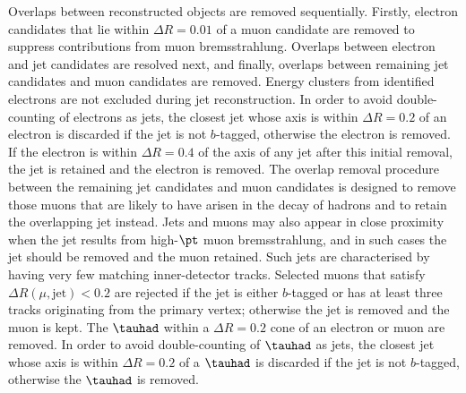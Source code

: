 Overlaps between reconstructed objects are removed sequentially. Firstly, electron candidates that lie 
within $\Delta R = 0.01$ of a muon candidate are removed to suppress contributions from muon bremsstrahlung. 
Overlaps between electron and jet candidates are resolved next, and finally, overlaps between remaining jet candidates 
and muon candidates are removed. Energy clusters from identified electrons are not excluded during jet reconstruction. 
In order to avoid double-counting of electrons as jets, the closest jet whose axis is within ${\Delta}R = 0.2$ of an electron 
is discarded if the jet is not $b$-tagged, otherwise the electron is removed.
If the electron is within ${\Delta}R = 0.4$ of the axis of any jet after this initial removal, the jet is retained and  the electron is removed.
The overlap removal procedure between the remaining jet candidates and muon candidates is designed to remove those muons 
that are likely to have arisen in the decay of hadrons and to retain the overlapping jet instead. 
Jets and muons may also appear in close proximity when the jet results from high-$\pt$ muon bremsstrahlung, 
and in such cases the jet should be removed and the muon retained. Such jets are characterised by having very 
few matching inner-detector tracks. Selected muons that satisfy $\Delta R(\mu,{\textrm{jet}}) < 0.2$ are rejected
if the jet is either $b$-tagged or has at least three tracks originating from the primary vertex; otherwise the jet is removed and the muon is kept.
The $\tauhad$ within a $\Delta R=0.2$ cone of an electron or muon are removed.
In order to avoid double-counting of $\tauhad$ as jets, the closest jet whose axis is
within ${\Delta}R = 0.2$ of a $\tauhad$ is discarded if the jet is not $b$-tagged, otherwise the $\tauhad$ is removed. 

